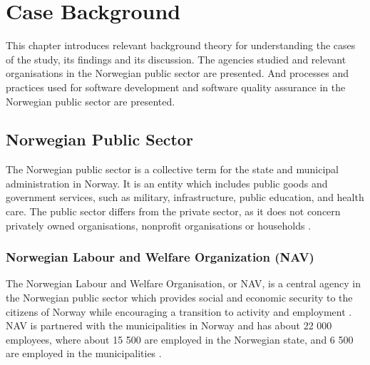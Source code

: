 \chapter{Case Background} \label{sec:case_background}
This chapter introduces relevant background theory for understanding the cases of the study, its findings and its discussion. The agencies studied and relevant organisations in the Norwegian public sector are presented. And processes and practices used for software development and software quality assurance in the Norwegian public sector are presented. 

\section{Norwegian Public Sector}
The Norwegian public sector is a collective term for the state and municipal administration in Norway. It is an entity which includes public goods and government services, such as military, infrastructure, public education, and health care. The public sector differs from the private sector, as it does not concern privately owned organisations, nonprofit organisations or households \cite{os_snl_2022}\cite{ps_wiki_2023}.

\subsection{Norwegian Labour and Welfare Organization (NAV)}
The Norwegian Labour and Welfare Organisation, or NAV, is a central agency in the Norwegian public sector which provides social and economic security to the citizens of Norway while encouraging a transition to activity and employment \cite{nav_r_2023}. NAV is partnered with the municipalities in Norway and has about 22 000 employees, where about 15 500 are employed in the Norwegian state, and 6 500 are employed in the municipalities \cite{org_nav_2023}. 


